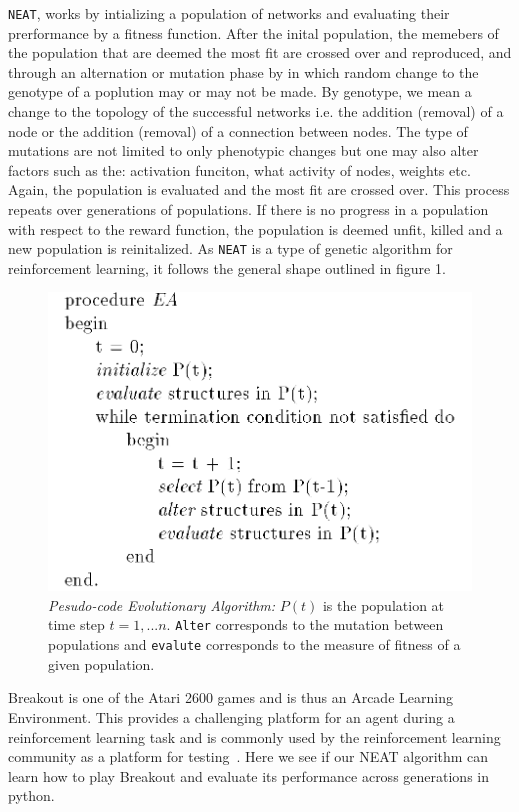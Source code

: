 \documentclass[letterpaper, twocolumn, conference]{article}
\begin{document}
\texttt{NEAT}, works by intializing a population of networks and evaluating their prerformance by a fitness function. After the inital population, the memebers of the population that are deemed the most fit are crossed over and reproduced, and through an alternation or mutation phase by in which random change to the genotype of a poplution may or may not be made. By genotype, we mean a change to the topology of the successful networks i.e. the addition (removal) of a node or the addition (removal) of a connection between nodes. The type of mutations are not limited to only phenotypic changes but one may also alter factors such as the:  activation funciton, what activity of nodes, weights etc. Again, the population is evaluated and the most fit are crossed over. This process repeats over generations of populations. If there is no progress in a population with respect to the reward function, the population is deemed unfit, killed and a new population is reinitalized. As \texttt{NEAT} is a type of genetic algorithm for reinforcement learning, it follows the general shape outlined in figure 1.

\begin{figure}
    \includegraphics{EA.png}
    \caption{\textit{Pesudo-code Evolutionary Algorithm:} $P(t)$ is the population at time step $t=1,...n$. \texttt{Alter} corresponds to the mutation between populations and \texttt{evalute} corresponds to the measure of fitness of a given population. \cite{Grefenstette99} }
\end{figure}

Breakout is one of the  Atari 2600 games  and is thus an Arcade Learning Environment. This provides a challenging platform for an agent during a reinforcement learning task and is commonly used by the reinforcement learning community as a platform for testing~\cite{Machado17}. Here we see if our NEAT algorithm can learn how to play Breakout and evaluate its performance across generations in python.
\end{document}
